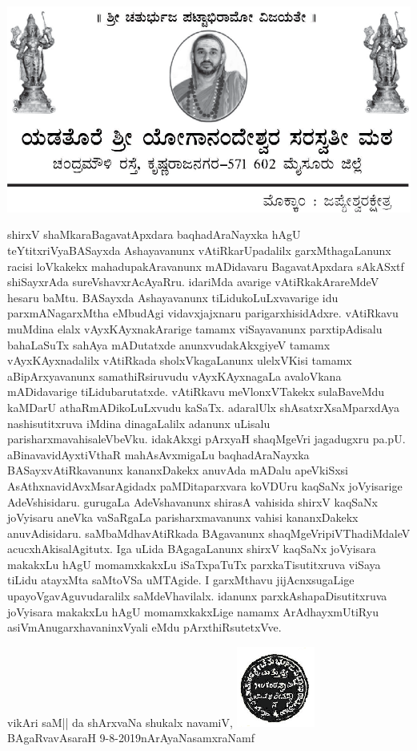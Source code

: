 \thispagestyle{empty}
\begin{center}
\includegraphics{figures/krletterhead.eps}
\end{center}

{\fontsize{10pt}{12pt}\selectfont
\noindent
shirxV shaMkaraBagavatApxdara baqhadAraNayxka hAgU teYtitxriVyaBASayxda Ashayavanunx vAtiRkarUpadalilx garxMthagaLanunx racisi loVkakekx mahadupakAravanunx mADidavaru BagavatApxdara sAkASxtf shiSayxrAda sureVshavxrAcAyaRru. idariMda avarige vAtiRka\-kArareMdeV hesaru baMtu. BASayxda Ashayavanunx tiLidukoLuLxvavarige idu parxmANagarxMtha eMbudAgi vidavxjajxnaru parigarxhisidAdxre. vAtiRkavu muMdina elalx vAyxKAyxnakArarige tamamx viSayavanunx parxtipAdisalu bahaLaSuTx sahAya mADutatxde anunxvudakAkxgiyeV tamamx vAyxKAyxnadalilx vAtiRkada sholxVkagaLanunx ulelxVKisi tamamx aBipArxyavanunx samathiRsiruvudu vAyxKAyxnagaLa avaloVkana mADidavarige tiLidubarutatxde. vAtiRkavu meVlonxVTakekx sulaBaveMdu kaMDarU athaRmADikoLuLxvudu kaSaTx. adaralUlx shAsatxrXsaMparxdAya nashisutitxruva iMdina dinagaLalilx adanunx uLisalu parisharxmavahisaleVbeVku. idakAkxgi pArxyaH shaqMgeVri jagadugxru pa.pU. aBinavavidAyxtiVthaR mahAsAvxmigaLu baqhadAraNayxka BASayxvAtiRkavanunx kananxDakekx anuvAda mADalu apeVkiSxsi AsAthxnavidAvxMsarAgidadx paMDitaparxvara koVDUru kaqSaNx joVyisarige AdeVshisidaru. gurugaLa AdeVshavanunx shirasA vahisida  shirxV kaqSaNx joVyisaru aneVka vaSaRgaLa parisharxmavanunx vahisi kananxDakekx anuvAdisidaru. saMbaMdhavAtiRkada BAgavanunx shaqMgeVripiVThadiMdaleV acucxhAkisalAgitutx. Iga uLida BAgagaLanunx shirxV kaqSaNx joVyisara makakxLu hAgU momamxkakxLu iSaTxpaTuTx parxkaTisutitxruva viSaya tiLidu atayxMta saMtoVSa uMTAgide. I garxMthavu jijAcnxsugaLige upayoVgavAguvudaralilx saMdeVhavilalx.  idanunx parxkAshapaDisutitxruva joVyisara makakxLu hAgU momamxkakxLige namamx ArAdhayx\-mUtiRyu asiVmAnugarxhavaninxVyali eMdu pArxthiRsutetxVve.

\noindent	
vikAri saM|| da shArxvaNa shukalx navamiV, \hfill \includegraphics{figures/sriseal.eps}\\
BAgaRvavAsaraH {\rm 9-8-2019}\hfill nArAyaNasamxraNamf
}

	
	
